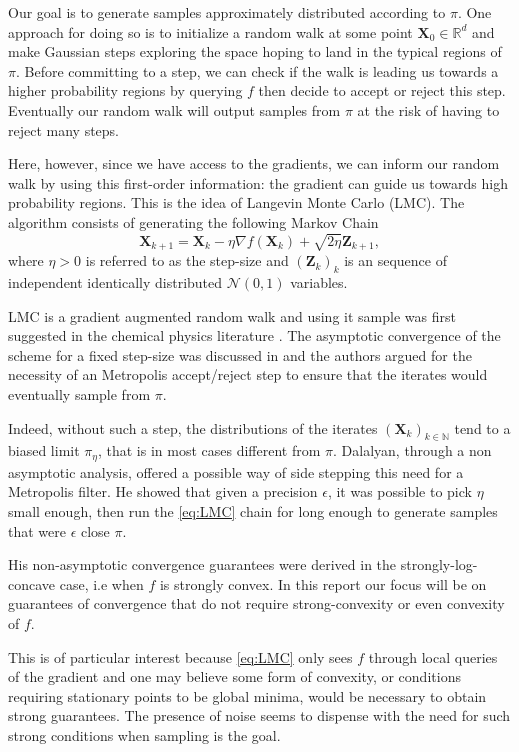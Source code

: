 \documentclass[11pt,twoside]{article}
\theoremstyle{definition}
\newcommand{\R}{\mathbb{R}}
\newcommand{\bX}{\mathbf{X}}
\begin{document}
Our goal is to generate samples approximately distributed according to $\pi$. One approach for doing so is to initialize a random walk at some point $\bX_0 \in \R^d$ and make Gaussian steps exploring the space hoping to land in the typical regions of $\pi$. Before committing to a step, we can check if the walk is leading us towards a higher probability regions by querying $f$ then decide to accept or reject this step. Eventually our random walk will output samples from $\pi$ at the risk of having to reject many steps. 

Here, however, since we have access to the gradients, we can inform our random walk by using this first-order information: the gradient can guide us towards high probability regions. This is the idea of Langevin Monte Carlo (LMC). The algorithm consists of generating the following Markov Chain 
\begin{equation}
\bX_{k+1} = \bX_k - \eta \nabla f(\bX_k) + \sqrt{2\eta}\mathbf{Z}_{k+1},
\label{eq:LMC}
\tag{LMC}
\end{equation}
where $\eta > 0$ is referred to as the step-size and $(\mathbf{Z}_k)_k$ is an sequence of independent identically distributed $\mathcal{N}(0, 1)$ variables.

LMC is a gradient augmented random walk and using it sample was first suggested in the chemical physics literature \cite{rossky_brownian_1978}. The asymptotic convergence of the scheme for a fixed step-size was discussed in \cite{roberts_exponential_1996} and the authors argued for the necessity of an Metropolis accept/reject step to ensure that the iterates would eventually sample from $\pi$.

Indeed, without such a step, the distributions of the iterates $(\bX_k)_{k\in \mathbb{N}}$ tend to a biased limit $\pi_\eta$, that is in most cases different from $\pi$. Dalalyan, through a non asymptotic analysis, offered a possible way of side stepping this need for a Metropolis filter. He showed that given a precision $\epsilon$, it was possible to pick $\eta$ small enough, then run the \eqref{eq:LMC} chain for long enough to generate samples that were $\epsilon$ close $\pi$.

His non-asymptotic convergence guarantees were derived in the strongly-log-concave case, i.e when $f$ is strongly convex. In this report our focus will be on guarantees of convergence that do not require strong-convexity or even convexity of $f$. 

This is of particular interest because \eqref{eq:LMC} only sees $f$ through local queries of the gradient and one may believe some form of convexity, or conditions requiring stationary points to be global minima, would be necessary to obtain strong guarantees. The presence of noise seems to dispense with the need for such strong conditions when sampling is the goal.
\end{document}
